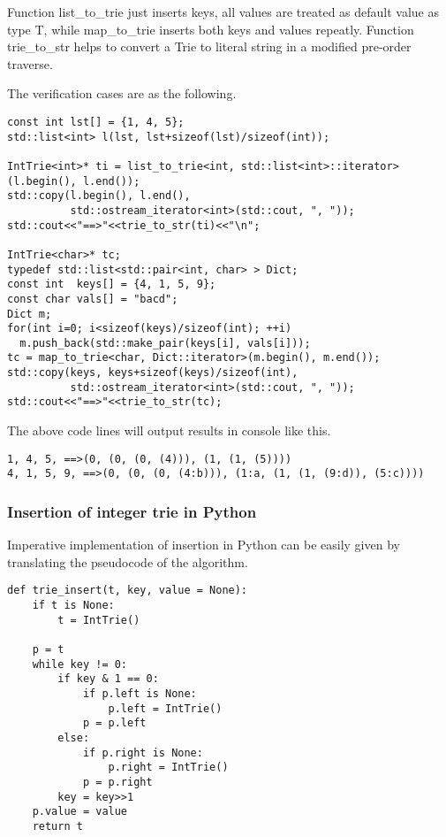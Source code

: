 \documentclass{article}
\begin{document}
Function list\_to\_trie just inserts keys, all values are treated as default
value as type T, while map\_to\_trie inserts both keys and values repeatly.
Function trie\_to\_str helps to convert a Trie to literal string in a modified
pre-order traverse.

The verification cases are as the following.

\begin{lstlisting}
const int lst[] = {1, 4, 5};
std::list<int> l(lst, lst+sizeof(lst)/sizeof(int));

IntTrie<int>* ti = list_to_trie<int, std::list<int>::iterator>(l.begin(), l.end());
std::copy(l.begin(), l.end(), 
          std::ostream_iterator<int>(std::cout, ", "));
std::cout<<"==>"<<trie_to_str(ti)<<"\n";
    
IntTrie<char>* tc;
typedef std::list<std::pair<int, char> > Dict;
const int  keys[] = {4, 1, 5, 9};
const char vals[] = "bacd";
Dict m;
for(int i=0; i<sizeof(keys)/sizeof(int); ++i)
  m.push_back(std::make_pair(keys[i], vals[i]));
tc = map_to_trie<char, Dict::iterator>(m.begin(), m.end());
std::copy(keys, keys+sizeof(keys)/sizeof(int),
          std::ostream_iterator<int>(std::cout, ", "));
std::cout<<"==>"<<trie_to_str(tc);
\end{lstlisting}

The above code lines will output results in console like this.
\begin{verbatim}
1, 4, 5, ==>(0, (0, (0, (4))), (1, (1, (5))))
4, 1, 5, 9, ==>(0, (0, (0, (4:b))), (1:a, (1, (1, (9:d)), (5:c))))
\end{verbatim}

\subsubsection*{Insertion of integer trie in Python}
Imperative implementation of insertion in Python can be easily given by translating
the pseudocode of the algorithm.

\lstset{language=Python}
\begin{lstlisting}
def trie_insert(t, key, value = None):
    if t is None:
        t = IntTrie()

    p = t
    while key != 0:
        if key & 1 == 0:
            if p.left is None:
                p.left = IntTrie()
            p = p.left
        else:
            if p.right is None:
                p.right = IntTrie()
            p = p.right
        key = key>>1
    p.value = value
    return t
\end{lstlisting}
\end{document}
